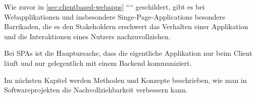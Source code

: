 Wie zuvor in \autoref{sec:clientbased-webapps} ```` geschildert, gibt es bei Webapplikationen und insbesondere Singe-Page-Applications besondere Barrikaden, die es den Stakeholdern erschwert das Verhalten einer Applikation und die Interaktionen eines Nutzers nachzuvollziehen.
	
Bei SPAs ist die Hauptursache, dass die eigentliche Applikation nur beim Client läuft und nur gelegentlich mit einem Backend kommuniziert.
	
Im nächsten Kapitel werden Methoden und Konzepte beschrieben, wie man in Softwareprojekten die Nachvollziehbarkeit verbessern kann.


